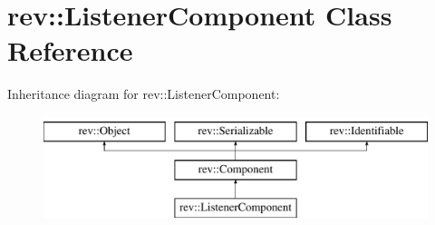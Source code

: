 \hypertarget{classrev_1_1_listener_component}{}\section{rev\+::Listener\+Component Class Reference}
\label{classrev_1_1_listener_component}
Inheritance diagram for rev\+::Listener\+Component\+:\begin{figure}[H]
\begin{center}
\leavevmode
\includegraphics[height=3.000000cm]{classrev_1_1_listener_component}
\end{center}
\end{figure}
